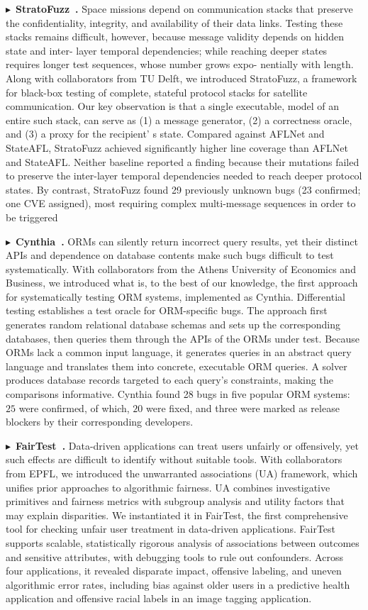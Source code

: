 \documentclass[10pt,letterpaper]{article}
\newcommand{\project}[2]{\par\Needspace{6\baselineskip}\noindent
  $\blacktriangleright$~\textbf{#1~\cite{#2}.}}
\begin{document}
\project{StratoFuzz}{stratofuzz}
Space missions depend on communication stacks that
preserve the confidentiality, integrity, and availability of their
data links. Testing these stacks remains difficult, however,
because message validity depends on hidden state and inter-
layer temporal dependencies; while reaching deeper states
requires longer test sequences, whose number grows expo-
nentially with length. Along with collaborators from TU Delft,
we introduced StratoFuzz, a framework for black-box testing
of complete, stateful protocol stacks for satellite communication. Our key
observation is that a single executable, model of an entire such stack, can
serve as (1) a message generator, (2) a correctness oracle, and (3) a proxy for
the recipient' s state. Compared against AFLNet and StateAFL, StratoFuzz
achieved significantly higher line coverage than AFLNet and StateAFL. Neither
baseline reported a finding because their mutations failed to preserve the
inter-layer temporal dependencies needed to reach deeper protocol states.
By contrast, StratoFuzz found 29 previously unknown bugs (23 confirmed; one CVE
assigned), most requiring complex multi-message sequences in order to be
triggered

\project{Cynthia}{cynthia}
ORMs can silently return incorrect query results, yet their distinct APIs and
dependence on database contents make such bugs difficult to test systematically.
With collaborators from the Athens University of Economics and Business, we
introduced what is, to the best of our knowledge, the first approach for
systematically testing ORM systems, implemented as Cynthia. Differential
testing establishes a test oracle for ORM-specific bugs. The approach first
generates random relational database schemas and sets up the corresponding
databases, then queries them through the APIs of the ORMs under test. Because
ORMs lack a common input language, it generates queries in an abstract query
language and translates them into concrete, executable ORM queries. A solver
produces database records targeted to each query's constraints, making the
comparisons informative. Cynthia found 28 bugs in five popular ORM systems:
$25$ were confirmed, of which, $20$ were fixed, and three were marked as
release blockers by their corresponding developers.

\project{FairTest}{fairtest}
Data-driven applications can treat users unfairly or offensively, yet such
effects are difficult to identify without suitable tools. With collaborators
from EPFL, we introduced the unwarranted associations (UA) framework, which
unifies prior approaches to algorithmic fairness. UA combines investigative
primitives and fairness metrics with subgroup analysis and utility factors
that may explain disparities. We instantiated it in FairTest, the first
comprehensive tool for checking unfair user treatment in data-driven
applications. FairTest supports scalable, statistically rigorous analysis of
associations between outcomes and sensitive attributes, with debugging tools
to rule out confounders. Across four applications, it revealed disparate
impact, offensive labeling, and uneven algorithmic error rates, including
bias against older users in a predictive health application and offensive
racial labels in an image tagging application.
\end{document}
